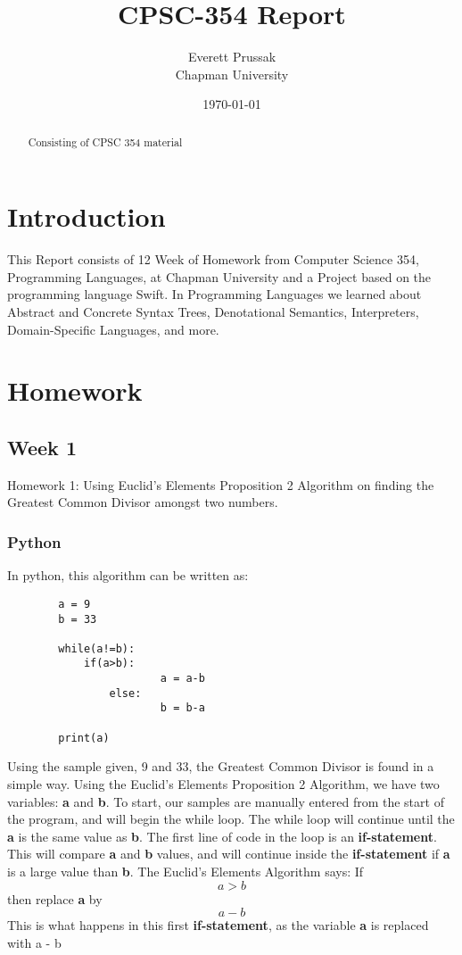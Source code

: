 \documentclass{article}
\title{CPSC-354 Report}
\author{Everett Prussak  \\ Chapman University}
\date{\today}
\theoremstyle{theorem}
\theoremstyle{definition}
\theoremstyle{remark}
\begin{document}
\maketitle

\begin{abstract}
Consisting of CPSC 354 material
\end{abstract}

\tableofcontents

\section{Introduction}\label{intro}

This Report consists of 12 Week of Homework from Computer Science 354, Programming Languages, at Chapman University and a Project based on the programming language Swift. In Programming Languages we learned about Abstract and Concrete Syntax Trees, Denotational Semantics, Interpreters, Domain-Specific Languages, and more.

\section{Homework}

\subsection{Week 1}

Homework 1: Using Euclid's Elements Proposition 2 Algorithm on finding the Greatest Common Divisor amongst two numbers.

\subsubsection{Python}
In python, this algorithm can be written as:
\begin{verbatim}
		a = 9
		b = 33

		while(a!=b):
   			if(a>b):
        				a = a-b
    			else:
        				b = b-a
    
		print(a)
\end{verbatim}

Using the sample given, 9 and 33, the Greatest Common Divisor is found in a simple way. Using the Euclid's Elements Proposition 2 Algorithm, we have two variables: \textbf{a} and \textbf{b}. To start, our samples are manually entered from the start of the program, and will begin the while loop. The while loop will continue until the \textbf{a} is the same value as \textbf{b}. The first line of code in the loop is an \textbf{if-statement}. This will compare \textbf{a} and \textbf{b} values, and will continue inside the \textbf{if-statement} if \textbf{a} is a large value than \textbf{b}. The Euclid's Elements Algorithm says: If \[a > b\] then replace \textbf{a} by \[a - b\]This is what happens in this first \textbf{if-statement}, as the variable \textbf{a} is replaced with a - b \medskip\noindent
\medskip\noindent
\end{document}
